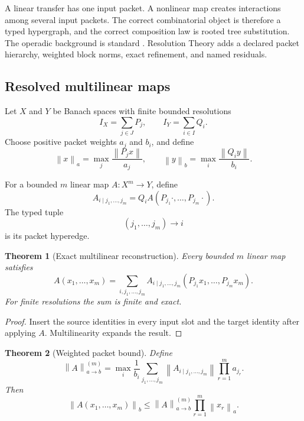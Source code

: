 \documentclass{aomart}
\newtheorem{theorem}{Theorem}[section]
\theoremstyle{definition}
\theoremstyle{remark}
\newcommand{\norm}[1]{\left\lVert#1\right\rVert}
\newcommand{\Rcite}[1]{\cite{#1}}
\begin{document}
A linear transfer has one input packet. A nonlinear map creates interactions among several input packets. The correct combinatorial object is therefore a typed hypergraph, and the correct composition law is rooted tree substitution. The operadic background is standard \Rcite{R14}. Resolution Theory adds a declared packet hierarchy, weighted block norms, exact refinement, and named residuals.

\subsection{Resolved multilinear maps}

Let \(X\) and \(Y\) be Banach spaces with finite bounded resolutions
\[
 I_X=\sum_{j\in J}P_j,
 \qquad
 I_Y=\sum_{i\in I}Q_i.
\]
Choose positive packet weights \(a_j\) and \(b_i\), and define
\[
 \norm{x}_a
 =
 \max_j\frac{\norm{P_jx}}{a_j},
 \qquad
 \norm{y}_b
 =
 \max_i\frac{\norm{Q_iy}}{b_i}.
\]

\begin{definition}\label{def:resolved_multilinear}
For a bounded \(m\) linear map \(A:X^m\to Y\), define
\[
 A_{i\mid j_1,\ldots,j_m}
 =
 Q_iA(P_{j_1}\cdot,\ldots,P_{j_m}\cdot).
\]
The typed tuple
\[
 (j_1,\ldots,j_m)\longrightarrow i
\]
is its packet hyperedge.
\end{definition}

\begin{theorem}[Exact multilinear reconstruction]\label{thm:multilinear_reconstruction}
Every bounded \(m\) linear map satisfies
\[
 \boxed{
 A(x_1,\ldots,x_m)
 =
 \sum_{i,j_1,\ldots,j_m}
 A_{i\mid j_1,\ldots,j_m}
 (P_{j_1}x_1,\ldots,P_{j_m}x_m).
 }
\]
For finite resolutions the sum is finite and exact.
\end{theorem}

\begin{proof}
Insert the source identities in every input slot and the target identity after applying \(A\). Multilinearity expands the result.
\end{proof}

\begin{theorem}[Weighted packet bound]\label{thm:weighted_packet_bound}
Define
\[
 \norm{A}^{(m)}_{a\to b}
 =
 \max_i\frac1{b_i}
 \sum_{j_1,\ldots,j_m}
 \norm{A_{i\mid j_1,\ldots,j_m}}
 \prod_{r=1}^{m}a_{j_r}.
\]
Then
\[
 \boxed{
 \norm{A(x_1,\ldots,x_m)}_b
 \le
 \norm{A}^{(m)}_{a\to b}
 \prod_{r=1}^{m}\norm{x_r}_a.
 }
\]
\end{theorem}
\end{document}
